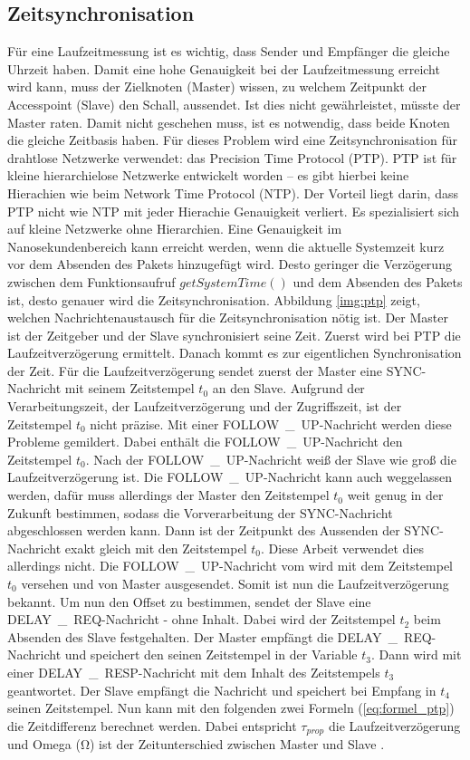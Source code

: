 \subsection{Zeitsynchronisation}
Für eine Laufzeitmessung ist es wichtig, dass Sender und Empfänger die gleiche Uhrzeit haben. Damit eine hohe Genauigkeit bei der Laufzeitmessung erreicht wird kann, muss der Zielknoten (Master) wissen, zu welchem Zeitpunkt der Accesspoint (Slave) den Schall, aussendet. Ist dies nicht gewährleistet, müsste der Master raten. Damit nicht geschehen muss, ist es notwendig, dass beide Knoten die gleiche Zeitbasis haben. Für dieses Problem wird eine Zeitsynchronisation für drahtlose Netzwerke verwendet: das Precision Time Protocol (PTP). PTP ist für kleine hierarchielose Netzwerke entwickelt worden -- es gibt hierbei keine Hierachien wie beim Network Time Protocol (NTP). Der Vorteil liegt darin, dass PTP nicht wie NTP mit jeder Hierachie Genauigkeit verliert. Es spezialisiert sich auf kleine Netzwerke ohne Hierarchien. Eine Genauigkeit im Nanosekundenbereich kann erreicht werden, wenn die aktuelle Systemzeit kurz vor dem Absenden des Pakets hinzugefügt wird. Desto geringer die Verzögerung zwischen dem Funktionsaufruf $getSystemTime()$ und dem Absenden des Pakets ist, desto genauer wird die Zeitsynchronisation. Abbildung \ref{img:ptp} zeigt, welchen Nachrichtenaustausch für die Zeitsynchronisation nötig ist. Der Master ist der Zeitgeber und der Slave synchronisiert seine Zeit. 
Zuerst wird bei PTP die Laufzeitverzögerung ermittelt. Danach kommt es zur eigentlichen Synchronisation der Zeit. Für die Laufzeitverzögerung sendet zuerst der Master eine \si{SYNC}-Nachricht mit seinem Zeitstempel $t_{0}$ an den Slave. Aufgrund der Verarbeitungszeit, der Laufzeitverzögerung und der Zugriffszeit, ist der Zeitstempel $t_{0}$ nicht präzise. Mit einer \si{FOLLOW\_UP}-Nachricht werden diese Probleme gemildert. Dabei enthält die \si{FOLLOW\_UP}-Nachricht den Zeitstempel $t_{0}$. Nach der \si{FOLLOW\_UP}-Nachricht weiß der Slave wie groß die Laufzeitverzögerung ist. Die \si{FOLLOW\_UP}-Nachricht kann auch weggelassen werden, dafür muss allerdings der Master den Zeitstempel $t_{0}$ weit genug in der Zukunft bestimmen, sodass die Vorverarbeitung der \si{SYNC}-Nachricht abgeschlossen werden kann. Dann ist der Zeitpunkt des Aussenden der \si{SYNC}-Nachricht exakt gleich mit den Zeitstempel $t_{0}$. Diese Arbeit verwendet dies allerdings nicht. Die \si{FOLLOW\_UP}-Nachricht vom wird mit dem Zeitstempel $t_{0}$ versehen und von Master ausgesendet. Somit ist nun die Laufzeitverzögerung bekannt.
Um nun den Offset zu bestimmen, sendet der Slave eine \si{DELAY\_REQ}-Nachricht - ohne Inhalt. Dabei wird der Zeitstempel $t_{2}$ beim Absenden des Slave festgehalten. Der Master empfängt die \si{DELAY\_REQ}-Nachricht und speichert den seinen Zeitstempel in der Variable $t_{3}$. Dann wird mit einer \si{DELAY\_RESP}-Nachricht mit dem Inhalt des Zeitstempels $t_{3}$ geantwortet. Der Slave empfängt die Nachricht und speichert bei Empfang in $t_{4}$ seinen Zeitstempel. Nun kann mit den folgenden zwei Formeln (\ref{eq:formel_ptp}) die Zeitdifferenz berechnet werden. Dabei entspricht $\tau_{prop}$ die Laufzeitverzögerung und Omega (\si{\ohm}) ist der Zeitunterschied zwischen Master und Slave \cite{src_PTP}.


